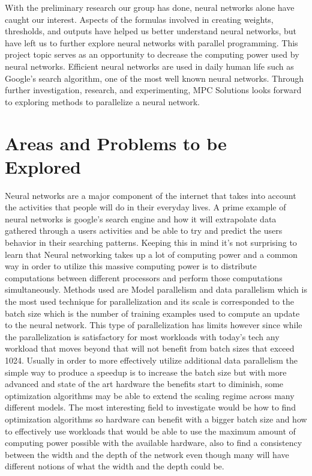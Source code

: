 \documentclass[twoside,twocolumn]{article}
\begin{document}
With the preliminary research our group has done, neural networks alone have caught our interest. Aspects of the formulas involved in creating weights, thresholds, and outputs have helped us better understand neural networks, but have left us to further explore neural networks with parallel programming. This project topic serves as an opportunity to decrease the computing power used by neural networks. Efficient neural networks are used in daily human life such as Google’s search algorithm, one of the most well known neural networks. Through further investigation, research, and experimenting, MPC Solutions looks forward to exploring methods to parallelize a neural network.



\section{Areas and Problems to be Explored}

Neural networks are a major component of the internet that takes into account the activities that people will do in their everyday lives. A prime example of neural networks is google’s search engine and how it will extrapolate data gathered through a users activities and be able to try and predict the users behavior in their searching patterns. Keeping this in mind it's not surprising to learn that Neural networking takes up a lot of computing power and a common way in order to utilize this massive computing power is to distribute computations between different processors and perform those computations simultaneously. Methods used are Model parallelism and data parallelism which is the most used technique for parallelization and its scale is corresponded to the batch size which is the number of training examples used to compute an update to the neural network. This type of parallelization has limits however since while the parallelization is satisfactory for most workloads with today's tech any workload that moves beyond that will not benefit from batch sizes that exceed 1024. 
Usually in order to more effectively utilize additional data parallelism the simple way to produce a speedup is to increase the batch size but with more advanced and state of the art hardware the benefits start to diminish, some optimization algorithms may be able to extend the scaling regime across many different models. The most interesting field to investigate would be how to find optimization algorithms so hardware can benefit with a bigger batch size and how to effectively use workloads that would be able to use the maximum amount of computing power possible with the available hardware, also to find a consistency between the width and the depth of the network even though many will have different notions of what the width and the depth could be.
\end{document}

